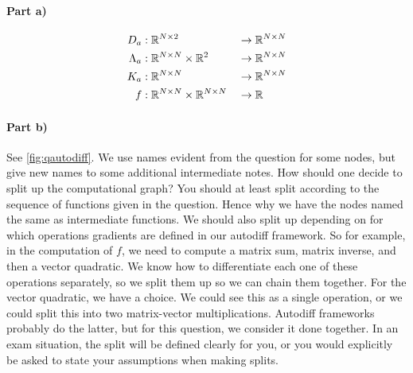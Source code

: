 \paragraph{Part a)}
\begin{align}
D_a &: \mathbb{R}^{N\times 2} &&\to \mathbb{R}^{N\times N} \\
\Lambda_a &: \mathbb{R}^{N\times N}\times \mathbb{R}^{2} &&\to \mathbb{R}^{N\times N} \\
K_a &: \mathbb{R}^{N\times N} &&\to \mathbb{R}^{N\times N} \\
f &: \mathbb{R}^{N\times N}\times\mathbb{R}^{N\times N} &&\to \mathbb{R}
\end{align}

\paragraph{Part b)} See \cref{fig:qautodiff}. We use names evident from the question for some nodes, but give new names to some additional intermediate notes. How should one decide to split up the computational graph? You should at least split according to the sequence of functions given in the question. Hence why we have the nodes named the same as intermediate functions. We should also split up depending on for which operations gradients are defined in our autodiff framework. So for example, in the computation of $f$, we need to compute a matrix sum, matrix inverse, and then a vector quadratic. We know how to differentiate each one of these operations separately, so we split them up so we can chain them together. For the vector quadratic, we have a choice. We could see this as a single operation, or we could split this into two matrix-vector multiplications. Autodiff frameworks probably do the latter, but for this question, we consider it done together. In an exam situation, the split will be defined clearly for you, or you would explicitly be asked to state your assumptions when making splits.
